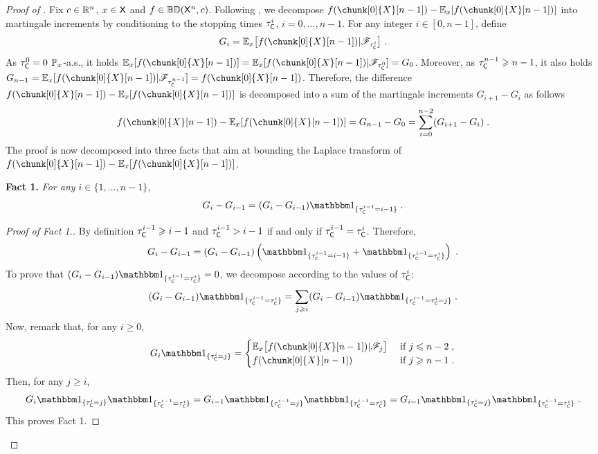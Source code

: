 \documentclass[leqno,11pt,a4paper]{article}
\begin{document}
\begin{proof}[Proof of ]
Fix $c\in \mathbb{R}^n$, $x\in\mathsf{X}$ and $f\in \mathbb{BD}(\mathsf{X}^n,c)$.
Following \cite{MR3407208}, we decompose $f(\chunk[0]{X}[n-1])-\Ebb_x[f(\chunk[0]{X}[n-1])]$ into martingale increments by conditioning to the stopping times $\tau_{\mathsf{C}}^i$, $i=0,\ldots, n-1$.
For any integer $i\in [0,n-1]$, define
\[
G_i=\Ebb_x\big[f(\chunk[0]{X}[n-1])|\cF_{\tau_{\cC}^i}\big]\eqsp.
\]
As $\tau_{\mathsf{C}}^0=0$ $\mathbb{P}_x$-a.s., it holds $\Ebb_x[f(\chunk[0]{X}[n-1])]=\Ebb_x[f(\chunk[0]{X}[n-1])|\cF_{\tau_{\cC}^0}]=G_0$.
Moreover, as $\tau_{\mathsf{C}}^{n-1}\geqslant n-1$, it also holds $G_{n-1}=\Ebb_x[f(\chunk[0]{X}[n-1])|\cF_{\tau_{\cC}^{n-1}}]=f(\chunk[0]{X}[n-1])$.
Therefore, the difference $f(\chunk[0]{X}[n-1])-\Ebb_x[f(\chunk[0]{X}[n-1])]$ is decomposed into a sum of the martingale increments $G_{i+1}-G_i$ as follows
\begin{equation}\label{eq:LinkWithG}
 f(\chunk[0]{X}[n-1])-\Ebb_x[f(\chunk[0]{X}[n-1])]=G_{n-1}-G_0=\sum_{i=0}^{n-2}(G_{i+1}-G_i)\eqsp.
\end{equation}
The proof is now decomposed into three facts that aim at bounding the Laplace transform of $f(\chunk[0]{X}[n-1])-\Ebb_x[f(\chunk[0]{X}[n-1])]$.

\noindent
{\bf Fact 1.} \emph{For any $i\in \{1,\ldots,n-1\}$,}
\begin{equation}\label{eq:Fact1}
 G_i-G_{i-1}=(G_i-G_{i-1})\indiacc{\tau_{\cC}^{i-1}=i-1}\eqsp.
\end{equation}
\begin{proof}[Proof of Fact 1.] By definition $\tau_{\mathsf{C}}^{i-1}\geqslant i-1$ and $\tau_{\mathsf{C}}^{i-1}> i-1$ if and only if $\tau_{\mathsf{C}}^{i-1}=\tau_{\mathsf{C}}^{i}$.
 Therefore,
 \[
 G_i-G_{i-1}=(G_i-G_{i-1})\left(\indiacc{\tau_{\cC}^{i-1}=i-1}+\indiacc{\tau_{\cC}^{i-1}=\tau_{\cC}^{i}}\right)\eqsp.
 \]
To prove that $(G_i-G_{i-1})\indiacc{\tau_{\cC}^{i-1}=\tau_{\cC}^{i}}=0$, we decompose according to the values of $\tau_{\mathsf{C}}^{i}$:
 \[
(G_i-G_{i-1})\indiacc{\tau_{\cC}^{i-1}=\tau_{\cC}^{i}}=\sum_{j\geqslant i} (G_i-G_{i-1})\indiacc{\tau_{\cC}^{i-1}=\tau_{\cC}^{i}=j}\eqsp.
 \]
Now, remark that, for any $i\geqslant 0$,
\begin{align}
 G_i\indiacc{\tau_{\cC}^{i}=j}=
\begin{cases}\label{eq:Gitaui=j}
 \Ebb_x\big[f(\chunk[0]{X}[n-1])|\cF_j\big]&\text{ if } j\leqslant n-2\eqsp,\\
 f(\chunk[0]{X}[n-1])&\text{ if } j\geqslant n-1\eqsp.
\end{cases}
\end{align}
Then, for any $j\geqslant i$,
\[
 G_i\indiacc{\tau_{\cC}^{i}=j}\indiacc{\tau_{\cC}^{i-1}=\tau_{\cC}^{i}}= G_{i-1}\indiacc{\tau_{\cC}^{i-1}=j}\indiacc{\tau_{\cC}^{i-1}=\tau_{\cC}^{i}}=G_{i-1}\indiacc{\tau_{\cC}^{i}=j}\indiacc{\tau_{\cC}^{i-1}=\tau_{\cC}^{i}}\eqsp.
\]
This proves Fact 1.
\end{proof}


\end{proof}
\end{document}
